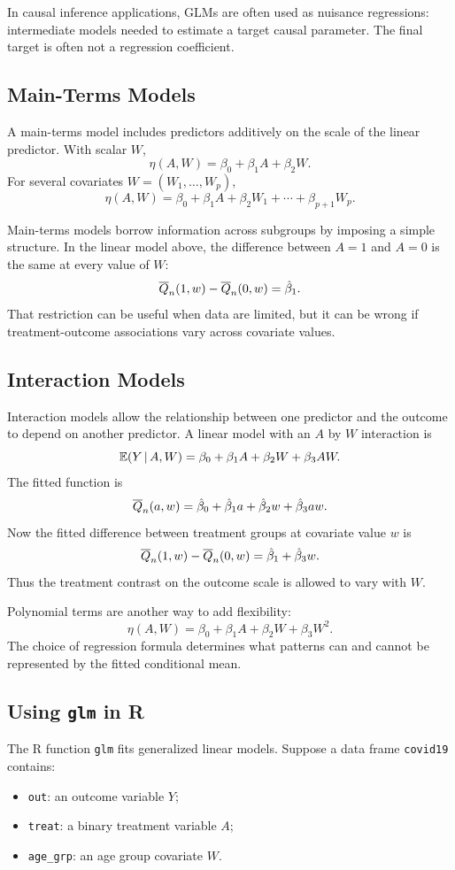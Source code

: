 In causal inference applications, GLMs are often used as nuisance regressions: intermediate models needed to estimate a target causal parameter. The final target is often not a regression coefficient.

\subsection{Main-Terms Models}

A main-terms model includes predictors additively on the scale of the linear predictor. With scalar $W$,
\[
\eta(A,W)=\beta_0+\beta_1A+\beta_2W.
\]
For several covariates $W=(W_1,\ldots,W_p)$,
\[
\eta(A,W)=\beta_0+\beta_1A+\beta_2W_1+\cdots+\beta_{p+1}W_p.
\]

Main-terms models borrow information across subgroups by imposing a simple structure. In the linear model above, the difference between $A=1$ and $A=0$ is the same at every value of $W$:
\[
\overline{Q}_n(1,w)-\overline{Q}_n(0,w)=\hat\beta_1.
\]
That restriction can be useful when data are limited, but it can be wrong if treatment-outcome associations vary across covariate values.

\subsection{Interaction Models}

Interaction models allow the relationship between one predictor and the outcome to depend on another predictor. A linear model with an $A$ by $W$ interaction is
\[
\mathbb{E}(Y\,\vert\, A,W)=\beta_0+\beta_1A+\beta_2W+\beta_3AW.
\]
The fitted function is
\[
\overline{Q}_n(a,w)=\hat\beta_0+\hat\beta_1a+\hat\beta_2w+\hat\beta_3aw.
\]
Now the fitted difference between treatment groups at covariate value $w$ is
\[
\overline{Q}_n(1,w)-\overline{Q}_n(0,w)=\hat\beta_1+\hat\beta_3w.
\]
Thus the treatment contrast on the outcome scale is allowed to vary with $W$.

Polynomial terms are another way to add flexibility:
\[
\eta(A,W)=\beta_0+\beta_1A+\beta_2W+\beta_3W^2.
\]
The choice of regression formula determines what patterns can and cannot be represented by the fitted conditional mean.

\subsection{Using \texttt{glm} in R}

The R function \texttt{glm} fits generalized linear models. Suppose a data frame \texttt{covid19} contains:
\begin{itemize}
  \item \texttt{out}: an outcome variable $Y$;
  \item \texttt{treat}: a binary treatment variable $A$;
  \item \texttt{age\_grp}: an age group covariate $W$.
\end{itemize}

